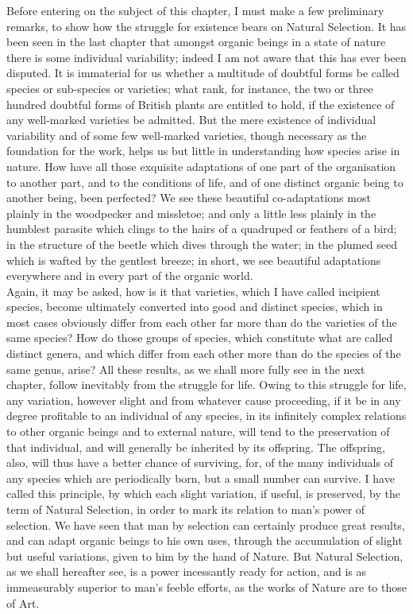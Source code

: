 \indent Before entering on the subject of this chapter, I must make a few preliminary remarks, to show how the struggle for existence bears on Natural Selection. It has been seen in the last chapter that amongst organic beings in a state of nature there is some individual variability; indeed I am not aware that this has ever been disputed. It is immaterial for us whether a multitude of doubtful forms be called species or sub-species or varieties; what rank, for instance, the two or three hundred doubtful forms of British plants are entitled to hold, if the existence of any well-marked varieties be admitted. But the mere existence of individual variability and of some few well-marked varieties, though necessary as the foundation for the work, helps us but little in understanding how species arise in nature. How have all those exquisite adaptations of one part of the organisation to another part, and to the conditions of life, and of one distinct organic being to another being, been perfected? We see these beautiful co-adaptations most plainly in the woodpecker and missletoe; and only a little less plainly in the humblest parasite which clings to the hairs of a quadruped or feathers of a bird; in the structure of the beetle which dives through the water; in the plumed seed which is wafted by the gentlest breeze; in short, we see beautiful adaptations everywhere and in every part of the organic world.\\
\indent Again, it may be asked, how is it that varieties, which I have called incipient species, become ultimately converted into good and distinct species, which in most cases obviously differ from each other far more than do the varieties of the same species? How do those groups of species, which constitute what are called distinct genera, and which differ from each other more than do the species of the same genus, arise? All these results, as we shall more fully see in the next chapter, follow inevitably from the struggle for life. Owing to this struggle for life, any variation, however slight and from whatever cause proceeding, if it be in any degree profitable to an individual of any species, in its infinitely complex relations to other organic beings and to external nature, will tend to the preservation of that individual, and will generally be inherited by its offspring. The offspring, also, will thus have a better chance of surviving, for, of the many individuals of any species which are periodically born, but a small number can survive. I have called this principle, by which each slight variation, if useful, is preserved, by the term of Natural Selection, in order to mark its relation to man's power of selection. We have seen that man by selection can certainly produce great results, and can adapt organic beings to his own uses, through the accumulation of slight but useful variations, given to him by the hand of Nature. But Natural Selection, as we shall hereafter see, is a power incessantly ready for action, and is as immeasurably superior to man's feeble efforts, as the works of Nature are to those of Art.\\
